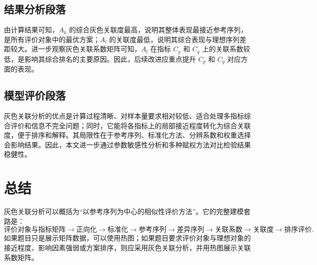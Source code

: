 \documentclass[UTF8,a4paper,11pt]{ctexart}
\begin{document}
\subsection{结果分析段落}
由计算结果可知，$A_k$ 的综合灰色关联度最高，说明其整体表现最接近参考序列，是所有评价对象中的最优方案；$A_l$ 的关联度最低，说明其综合表现与理想序列差距较大。进一步观察灰色关联系数矩阵可知，$A_l$ 在指标 $C_p$ 和 $C_q$ 上的关联系数较低，是影响其综合排名的主要原因。因此，后续改进应重点提升 $C_p$ 和 $C_q$ 对应方面的表现。

\subsection{模型评价段落}
灰色关联分析的优点是计算过程清晰、对样本量要求相对较低、适合处理多指标综合评价和信息不完全问题；同时，它能将各指标上的局部接近程度转化为综合关联度，便于排序和解释。其局限性在于参考序列、标准化方法、分辨系数和权重选择会影响结果。因此，本文进一步通过参数敏感性分析和多种赋权方法对比检验结果稳健性。

\section{总结}
灰色关联分析可以概括为“以参考序列为中心的相似性评价方法”。它的完整建模套路是：
\[
\text{评价对象与指标矩阵}\rightarrow \text{正向化}\rightarrow \text{标准化}\rightarrow \text{参考序列}\rightarrow \text{差异序列}\rightarrow \text{关联系数}\rightarrow \text{关联度}\rightarrow \text{排序评价}.
\]
如果题目只是展示矩阵数据，可以使用热图；如果题目要求评价对象与理想对象的接近程度、影响因素强弱或方案排序，则应采用灰色关联分析，并用热图展示关联系数矩阵。
\end{document}
